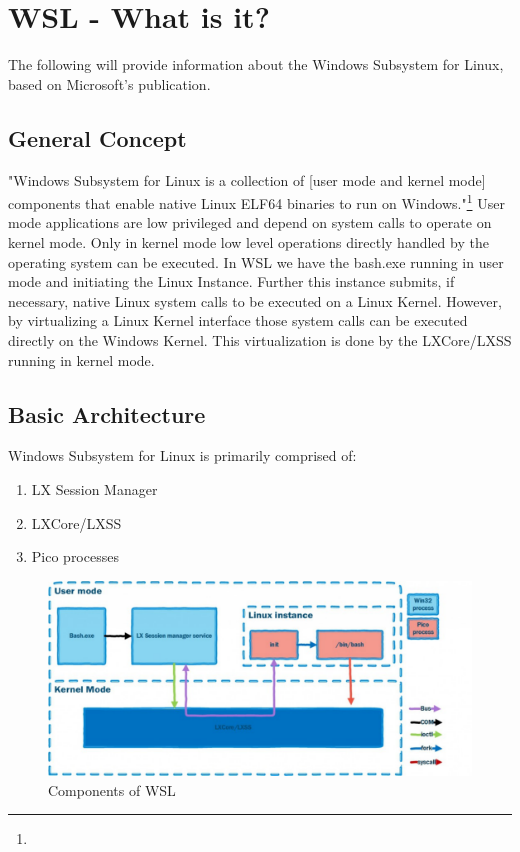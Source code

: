 \documentclass[utf8,biblatex, ngerman, english]{lni}
\begin{document}
\section{WSL - What is it?}
The following will provide information about the Windows Subsystem for Linux, based on Microsoft's publication.

\subsection{General Concept}
"Windows Subsystem for Linux is a collection of [user mode and kernel mode] components that enable native Linux ELF64 binaries to run on Windows."\footnote{} User mode applications are low privileged and depend on system calls to operate on kernel mode. Only in kernel mode low level operations directly handled by the operating system can be executed. In WSL we have the bash.exe running in user mode and initiating the Linux Instance. Further this instance submits, if necessary, native Linux system calls to be executed on a Linux Kernel. However, by virtualizing a Linux Kernel interface those system calls can be executed directly on the Windows Kernel. This virtualization is done by the LXCore/LXSS running in kernel mode.\cite{WSL16}

\subsection{Basic Architecture}



Windows Subsystem for Linux is primarily comprised of: 
\begin{enumerate}
    \item LX Session Manager
    \item LXCore/LXSS
    \item Pico processes\cite{WSL16}
\end{enumerate}

\begin{figure}
  \centering
  \includegraphics[width=1\textwidth]{WSL Architecture.pdf}
  \caption{Components of WSL \cite{WSL16}}
  \label{img:architecture}
\end{figure}
\end{document}
